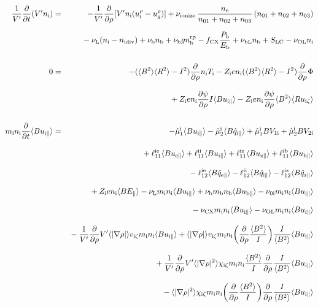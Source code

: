 \documentclass[11pt]{article}
\def\r#1{{\rm#1}}
\def\aves#1{\langle#1\rangle}
\def\dd#1#2{\frac{\partial #1}{\partial #2}}
\def\para{\parallel}
\def\ddrho{\frac{\partial}{\partial\rho}}
\def\ddt{\frac{\partial}{\partial t}}
\def\mi{m_\r{i}}
\def\mb{m_\r{b}}
\def\nee{n_\r{e}}
\def\ni{n_\r{i}}
\def\nb{n_\r{b}}
\def\Ti{T_\r{i}}
\def\Zi{Z_\r{i}}
\def\uzt#1{u_{\r{#1}\zeta}}
\def\upara#1{u_{\r{#1}\para}}
\def\qhatpara#1{\hat{q}_{\r{#1}\para}}
\def\urho#1{u_\r{#1}^\rho}
\def\ugrho{u_{g}^\rho}
\def\chis#1{\chi_\r{#1}}
\def\nun#1{\nu_\r{0#1}}
\def\ndiv#1{n_\r{#1div}}
\def\nbrp{n_\r{b}^\r{rp}}
\def\bri{\aves{B^2}\aves{R^2} - I^2}
\def\Pb{P_\r{b}}
\def\Eb{E_\r{b}}
\def\nna{n_{01}}
\def\nnb{n_{02}}
\def\nnc{n_{03}}
\def\fCX{f_\r{CX}}
\def\nuL{\nu_\r{L}}
\def\nuCX{\nu_\r{CX}}
\def\nuion{\nu_\r{ionize}}
\def\nub{\nu_\r{b}}
\def\nuOL{\nu_\r{OL}}
\def\nubL{\nu_\r{bL}}
\begin{document}
%
\begin{eqnarray}
  \frac{1}{V'} \ddt ( V' \ni ) &=&
%
  - \frac{1}{V'} \ddrho [ V' \ni (\urho{i} - \ugrho) ]
%
  + \nuion\, \frac{\nee}{\nna + \nnb + \nnc}\, (\nna + \nnb
  + \nnc)
%
\nonumber\\[2.5mm]&&{}
  - \nuL (\ni - \ndiv{i}) 
%
  + \nub \nb
%
  + \nub g \nbrp
%
  - \fCX \frac{\Pb}{\Eb}
%
  + \nubL \nb
%
  + S_\r{LC}
%
  - \nuOL \ni
%
\\[5mm]
  0 &=&
%
  -           ( \bri ) \ddrho \ni \Ti
%
  - \Zi e \ni ( \bri ) \ddrho \Phi
\nonumber\\[3mm]&&{}
%
  + \Zi e \ni \dd{\psi}{\rho} I          \aves{B\upara{i}}
%
  - \Zi e \ni \dd{\psi}{\rho} \aves{B^2} \aves{R\uzt{i}}
\\[5mm]
  \mi \ni \ddt \aves{B \upara{i}} &=&
%
  - \hat{\mu}_1^\r{i} \aves{B \upara{i}} 
  - \hat{\mu}_2^\r{i} \aves{B \qhatpara{i}}
%
  + \hat{\mu}_1^\r{i} {B V_{1\r{i}}} 
  + \hat{\mu}_2^\r{i} {B V_{2\r{i}}}
\nonumber\\[3mm]&&{}
%
  + \ell_{11}^{\r{ie}} \aves{B \upara{e}}
  + \ell_{11}^{\r{ii}} \aves{B \upara{i}}
  + \ell_{11}^{\r{iz}} \aves{B \upara{z}}
  + \ell_{11}^{\r{ib}} \aves{B \upara{b}}
\nonumber\\[3mm]&&{}
%
  - \ell_{12}^{\r{ie}} \aves{B \qhatpara{e}}
  - \ell_{12}^{\r{ii}} \aves{B \qhatpara{i}}
  - \ell_{12}^{\r{iz}} \aves{B \qhatpara{z}}
\nonumber\\[3mm]&&{}
%
  + \Zi e \ni \aves{B E_\para}
%
%
%
  - \nuL  \mi \ni \aves{B \upara{i}}
%
  + \nub  \mb \nb \aves{B \upara{b}}
%
  - \nun{i} \mi \ni \aves{B \upara{i}}
\nonumber\\[3mm]&&{}
%
  - \nuCX \mi \ni \aves{B \upara{i}}
%
  - \nuOL \mi \ni \aves{B \upara{i}}
\nonumber\\[3mm]&&{}
%
  - \frac{1}{V'} \ddrho V' \aves{|\nabla \rho|} v_{\r{i}\zeta} \mi \ni \aves{B \upara{i}}
%
  + \aves{|\nabla \rho|} v_{\r{i}\zeta} \mi \ni 
  \biggl(\ddrho \frac{\aves{B^2}}{I} \biggl) \frac{I}{\aves{B^2}} \aves{B \upara{i}}
\nonumber\\[3mm]&&{}
%
  + \frac{1}{V'} \ddrho V' \aves{|\nabla \rho|^2} \chis{i\zeta} \mi \ni
  \frac{\aves{B^2}}{I} \ddrho \frac{I}{\aves{B^2}} \aves{B \upara{i}}
\nonumber\\[3mm]&&{}
%
  - \aves{|\nabla \rho|^2} \chis{i\zeta} \mi \ni \biggl( \ddrho
  \frac{\aves{B^2}}{I} \biggr) \ddrho \frac{I}{\aves{B^2}} \aves{B \upara{i}}

\end{eqnarray}
\end{document}
